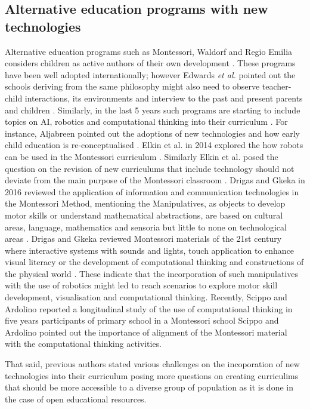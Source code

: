 \documentclass[conference]{IEEEtran}
\newcommand{\etal}{\textit{et al. }} %
\begin{document}
\subsection{Alternative education programs with new technologies}
Alternative education programs such as Montessori, Waldorf and Regio Emilia considers children as active authors of their own development \cite{edwards2002}.
These programs have been well adopted internationally; however Edwards \etal pointed out the schools deriving from the same philosophy might also need to observe teacher-child interactions, its environments and interview to the past and present parents and children \cite{edwards2002}.
Similarly, in the last 5 years such programs are starting to include topics on AI, robotics and computational thinking into their curriculum \cite{elkin2014, Aljabreen2020}.
For instance, Aljabreen pointed out the adoptions of new technologies and how early child education is re-conceptualised \cite{Aljabreen2020}. 
Elkin et al. in 2014 explored the how robots can be used in the Montessori curriculum \cite{elkin2014}.
Similarly Elkin et al. posed the question on the revision of new curriculums that include technology should not deviate from the main purpose of the Montessori classroom \cite{elkin2014}.
Drigas and Gkeka in 2016 reviewed the application of information and communication technologies in the Montessori Method, mentioning the Manipulatives, as objects to develop motor skills or understand mathematical abstractions, are based on cultural areas, language, mathematics and sensoria but little to none on technological areas \cite{DrigasGkeka2016}.
Drigas and Gkeka reviewed Montessori materials of the 21st century where interactive systems with sounds and lights, touch application to enhance visual literacy or the development of computational thinking and constructions of the physical world \cite{DrigasGkeka2016}.
These indicate that the incorporation of such manipulatives with the use of robotics might led to reach scenarios to explore motor skill development, visualisation and computational thinking. 
Recently, Scippo and Ardolino reported a longitudinal study of the use of computational thinking in five years participants of primary school in a Montessori school \cite{ScippoArdolino2021}
Scippo and Ardolino pointed out the importance of alignment of the Montessori material with the computational thinking activities. 

That said, previous authors stated various challenges on the incoporation of new technologies into their curriculum posing more questions on creating curriculims that should be more accessible to a diverse group of population as it is done in the case of open educational resources.
\end{document}
